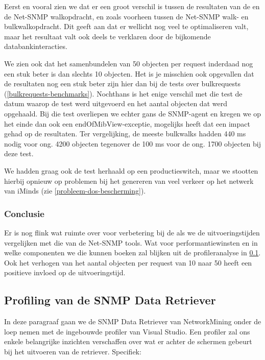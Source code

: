Eerst en vooral zien we dat er een groot verschil is tussen de resultaten van de \nwmretriever{}
en de Net-SNMP walkopdracht, en zoals voorheen tussen de Net-SNMP walk- en bulkwalkopdracht.
Dit geeft aan dat er wellicht nog veel te optimaliseren valt, maar het resultaat valt ook deels te verklaren door de bijkomende databankinteracties.

We zien ook dat het samenbundelen van 50 objecten per request inderdaad nog een stuk beter is dan slechts 10 objecten.
Het is je misschien ook opgevallen dat de resultaten nog een stuk beter zijn hier dan bij de tests over bulkrequests (\cref{bulkrequests-benchmarks}).
Nochthans is het enige verschil met die test de datum waarop de test werd uitgevoerd en het aantal objecten dat werd opgehaald.
Bij die test overliepen we echter gans de SNMP-agent en kregen we op het einde dan ook een endOfMibView-exceptie,
mogelijks heeft dat een impact gehad op de resultaten.
Ter vergelijking, de meeste bulkwalks hadden 440 ms nodig voor ong. 4200 objecten tegenover de 100 ms voor de ong. 1700 objecten bij deze test.

We hadden graag ook de test herhaald op een productieswitch,
maar we stootten hierbij opnieuw op problemen bij het genereren van veel verkeer op het netwerk van iMinds (zie \cref{probleem-dos-bescherming}).


\subsubsection{Conclusie}

Er is nog flink wat ruimte over voor verbetering bij de \nwmretriever{} als we de uitvoeringstijden vergelijken met die van de Net-SNMP tools.
Wat voor performantiewinsten en in welke componenten we die kunnen boeken zal blijken uit de profileranalyse in \cref{profiling}.
Ook het verhogen van het aantal objecten per request van 10 naar 50 heeft een positieve invloed op de uitvoeringstijd.

\subsection{Profiling van de SNMP Data Retriever}
\label{profiling}

In deze paragraaf gaan we de SNMP Data Retriever van NetworkMining onder de loep nemen met de ingebouwde profiler van Visual Studio.
Een profiler zal ons enkele belangrijke inzichten verschaffen over wat er achter de schermen gebeurt bij het uitvoeren van de retriever.
Specifiek:

